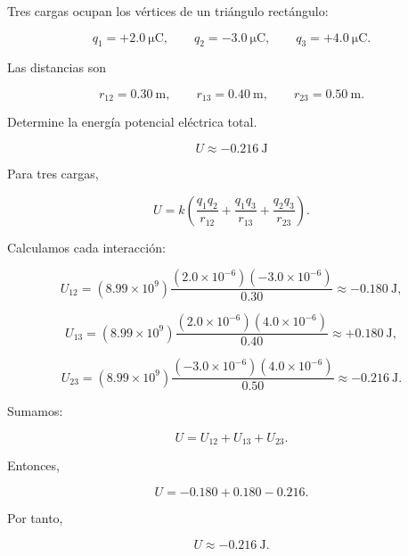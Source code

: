 \begin{ejercicio}

Tres cargas ocupan los vértices de un triángulo rectángulo:

\[
q_1=+\SI{2.0}{\micro\coulomb},
\qquad
q_2=-\SI{3.0}{\micro\coulomb},
\qquad
q_3=+\SI{4.0}{\micro\coulomb}.
\]

Las distancias son

\[
r_{12}=\SI{0.30}{\metre},
\qquad
r_{13}=\SI{0.40}{\metre},
\qquad
r_{23}=\SI{0.50}{\metre}.
\]

\begin{center}
\end{center}

Determine la energía potencial eléctrica total.

\end{ejercicio}

\begin{respuesta}

\[
\boxed{U\approx-\SI{0.216}{\joule}}
\]

\end{respuesta}

\begin{explicacion}

Para tres cargas,

\[
U
=
k
\left(
\frac{q_1q_2}{r_{12}}
+
\frac{q_1q_3}{r_{13}}
+
\frac{q_2q_3}{r_{23}}
\right).
\]

Calculamos cada interacción:

\[
U_{12}
=
(8.99\times10^9)
\frac{(2.0\times10^{-6})(-3.0\times10^{-6})}{0.30}
\approx-\SI{0.180}{\joule},
\]

\[
U_{13}
=
(8.99\times10^9)
\frac{(2.0\times10^{-6})(4.0\times10^{-6})}{0.40}
\approx+\SI{0.180}{\joule},
\]

\[
U_{23}
=
(8.99\times10^9)
\frac{(-3.0\times10^{-6})(4.0\times10^{-6})}{0.50}
\approx-\SI{0.216}{\joule}.
\]

Sumamos:

\[
U=U_{12}+U_{13}+U_{23}.
\]

Entonces,

\[
U=-0.180+0.180-0.216.
\]

Por tanto,

\[
\boxed{U\approx-\SI{0.216}{\joule}}.
\]

\end{explicacion}


